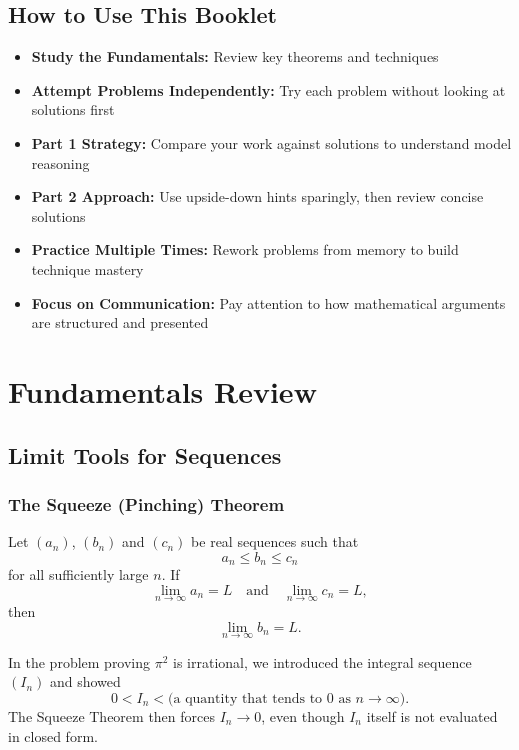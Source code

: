 \documentclass[12pt]{article}
\begin{document}
\subsection{How to Use This Booklet}
\begin{itemize}[leftmargin=*]
  \item \textbf{Study the Fundamentals:} Review key theorems and techniques 
  \item \textbf{Attempt Problems Independently:} Try each problem without looking at solutions first
  \item \textbf{Part 1 Strategy:} Compare your work against solutions to understand model reasoning
  \item \textbf{Part 2 Approach:} Use upside-down hints sparingly, then review concise solutions
  \item \textbf{Practice Multiple Times:} Rework problems from memory to build technique mastery
  \item \textbf{Focus on Communication:} Pay attention to how mathematical arguments are structured and presented
\end{itemize}

\newpage
\section{Fundamentals Review}

\subsection{Limit Tools for Sequences}

\subsubsection{The Squeeze (Pinching) Theorem}
\begin{theorem}
Let $(a_n)$, $(b_n)$ and $(c_n)$ be real sequences such that
\[
  a_n \le b_n \le c_n
\]
for all sufficiently large $n$. If
\[
  \lim_{n\to\infty} a_n = L
  \quad\text{and}\quad
  \lim_{n\to\infty} c_n = L,
\]
then
\[
  \lim_{n\to\infty} b_n = L.
\]
\end{theorem}

\begin{remark}
In the problem proving $\pi^2$ is irrational, we introduced the integral sequence $(I_n)$ and showed
\[
  0 < I_n < \text{(a quantity that tends to }0\text{ as }n\to\infty).
\]
The Squeeze Theorem then forces $I_n \to 0$, even though $I_n$ itself is not evaluated in closed form.
\end{remark}
\end{document}
